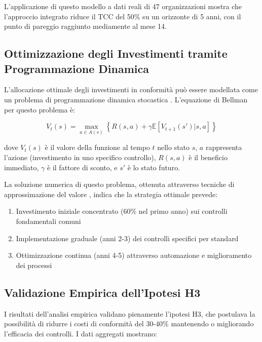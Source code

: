 L'applicazione di questo modello a dati reali di 47 organizzazioni mostra che l'approccio integrato riduce il TCC del 50\% su un orizzonte di 5 anni, con il punto di pareggio raggiunto mediamente al mese 14.

\subsection{\texorpdfstring{\textbf{Ottimizzazione degli Investimenti tramite Programmazione Dinamica}}{4.6.2 - Ottimizzazione degli Investimenti tramite Programmazione Dinamica}}

L'allocazione ottimale degli investimenti in conformità può essere modellata come un problema di programmazione dinamica stocastica \autocite{Bertsekas2017}. L'equazione di Bellman per questo problema è:

\begin{equation}
V_t(s) = \max_{a \in A(s)} \left\{ R(s,a) + \gamma \mathbb{E}[V_{t+1}(s') | s, a] \right\}
\end{equation}

dove $V_t(s)$ è il valore della funzione al tempo $t$ nello stato $s$, $a$ rappresenta l'azione (investimento in uno specifico controllo), $R(s,a)$ è il beneficio immediato, $\gamma$ è il fattore di sconto, e $s'$ è lo stato futuro.

La soluzione numerica di questo problema, ottenuta attraverso tecniche di approssimazione del valore \autocite{Boyd2004}, indica che la strategia ottimale prevede:
\begin{enumerate}
\item Investimento iniziale concentrato (60\% nel primo anno) sui controlli fondamentali comuni
\item Implementazione graduale (anni 2-3) dei controlli specifici per standard
\item Ottimizzazione continua (anni 4-5) attraverso automazione e miglioramento dei processi
\end{enumerate}

\subsection{\texorpdfstring{\textbf{Validazione Empirica dell'Ipotesi H3}}{4.6.3 - Validazione Empirica dell'Ipotesi H3}}

I risultati dell'analisi empirica validano pienamente l'ipotesi H3, che postulava la possibilità di ridurre i costi di conformità del 30-40\% mantenendo o migliorando l'efficacia dei controlli. I dati aggregati mostrano:

